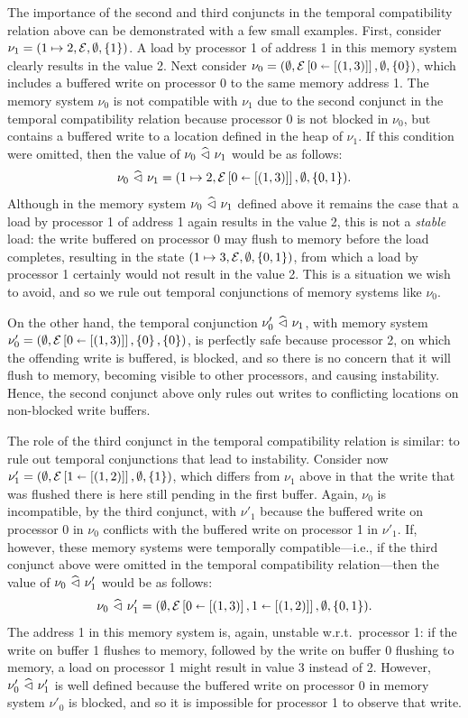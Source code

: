 \documentclass[11pt]{report}         %
\begin{document}
The importance of the second and third conjuncts in the temporal compatibility relation above can be demonstrated with a few small examples. First, consider $\nu_1 = (1 \mapsto 2, \mathcal{E}, \operatorname{\emptyset}, \left\lbrace 1 \right\rbrace)$. A load by processor 1 of address 1 in this memory system clearly results in the value 2. Next consider $\nu_0 = (\operatorname{\emptyset},\mathcal{E} \left[ 0 \shortleftarrow \left[(1,3)\right] \right],\operatorname{\emptyset},\left\lbrace 0 \right\rbrace)$, which includes a buffered write on processor 0 to the same memory address 1. The memory system $\nu_0$ is not compatible with $\nu_1$ due to the second conjunct in the temporal compatibility relation because processor 0 is not blocked in $\nu_0$, but contains a buffered write to a location defined in the heap of $\nu_1$. If this condition were omitted, then the value of $\nu_0 \operatorname{\,\widehat{\vartriangleleft}\,} \nu_1$ would be as follows: \[ \nu_0 \operatorname{\,\widehat{\vartriangleleft}\,} \nu_1 = (1 \mapsto 2, \mathcal{E} \left[ 0 \shortleftarrow \left[(1,3)\right] \right], \operatorname{\emptyset}, \left\lbrace 0,1 \right\rbrace).\] Although in the memory system $\nu_0 \operatorname{\,\widehat{\vartriangleleft}\,} \nu_1$ defined above it remains the case that a load by processor 1 of address 1 again results in the value 2, this is not a \emph{stable} load: the write buffered on processor 0 may flush to memory before the load completes, resulting in the state $(1 \mapsto 3, \mathcal{E}, \operatorname{\emptyset}, \left\lbrace 0,1 \right\rbrace)$, from which a load by processor 1 certainly would not result in the value 2. This is a situation we wish to avoid, and so we rule out temporal conjunctions of memory systems like $\nu_0$. 

On the other hand, the temporal conjunction $\nu'_0 \operatorname{\,\widehat{\vartriangleleft}\,} \nu_1$, with memory system $\nu'_0 = (\operatorname{\emptyset},\mathcal{E} \left[ 0 \shortleftarrow \left[(1,3)\right] \right],\left\lbrace 0 \right\rbrace,\left\lbrace 0 \right\rbrace)$, is perfectly safe because processor 2, on which the offending write is buffered, is blocked, and so there is no concern that it will flush to memory, becoming visible to other processors, and causing instability. Hence, the second conjunct above only rules out writes to conflicting locations on non-blocked write buffers. 

The role of the third conjunct in the temporal compatibility relation is similar: to rule out temporal conjunctions that lead to instability. Consider now $\nu'_1 = (\operatorname{\emptyset},\mathcal{E} \left[ 1 \shortleftarrow \left[(1,2)\right] \right], \operatorname{\emptyset}, \left\lbrace 1 \right\rbrace)$, which differs from $\nu_1$ above in that the write that was flushed there is here still pending in the first buffer. Again, $\nu_0$ is incompatible, by the third conjunct, with $\nu'_1$ because the buffered write on processor 0 in $\nu_0$ conflicts with the buffered write on processor 1 in $\nu'_1$. If, however, these memory systems were temporally compatible---i.e., if the third conjunct above were omitted in the temporal compatibility relation---then the value of $\nu_0 \operatorname{\,\widehat{\vartriangleleft}\,} \nu'_1$ would be as follows: \[ \nu_0 \operatorname{\,\widehat{\vartriangleleft}\,} \nu'_1 = (\operatorname{\emptyset}, \mathcal{E} \left[ 0 \shortleftarrow \left[(1,3)\right], 1 \shortleftarrow \left[(1,2)\right] \right], \operatorname{\emptyset}, \left\lbrace 0,1 \right\rbrace).\] The address 1 in this memory system is, again, unstable w.r.t.\ processor 1: if the write on buffer 1 flushes to memory, followed by the write on buffer 0 flushing to memory, a load on processor 1 might result in value 3 instead of 2. However, $\nu'_0 \operatorname{\,\widehat{\vartriangleleft}\,} \nu'_1$ is well defined because the buffered write on processor 0 in memory system $\nu'_0$ is blocked, and so it is impossible for processor 1 to observe that write. 
\end{document}
